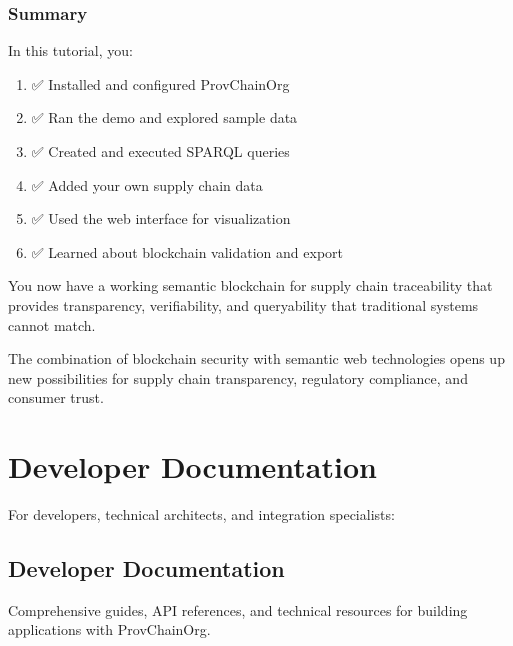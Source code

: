 \documentclass[letterpaper,10pt,english]{sphinxmanual}
\begin{document}
\subsubsection{Summary}
\label{\detokenize{user-guide/first-steps:summary}}
\sphinxAtStartPar
In this tutorial, you:
\begin{enumerate}
%
\item {} 
\sphinxAtStartPar
✅ Installed and configured ProvChainOrg

\item {} 
\sphinxAtStartPar
✅ Ran the demo and explored sample data

\item {} 
\sphinxAtStartPar
✅ Created and executed SPARQL queries

\item {} 
\sphinxAtStartPar
✅ Added your own supply chain data

\item {} 
\sphinxAtStartPar
✅ Used the web interface for visualization

\item {} 
\sphinxAtStartPar
✅ Learned about blockchain validation and export

\end{enumerate}

\sphinxAtStartPar
You now have a working semantic blockchain for supply chain traceability that provides transparency, verifiability, and queryability that traditional systems cannot match.

\sphinxAtStartPar
The combination of blockchain security with semantic web technologies opens up new possibilities for supply chain transparency, regulatory compliance, and consumer trust.




\section{Developer Documentation}
\label{\detokenize{index:developer-documentation}}
\sphinxAtStartPar
For developers, technical architects, and integration specialists:

\sphinxstepscope


\subsection{Developer Documentation}
\label{\detokenize{developer/index:developer-documentation}}\label{\detokenize{developer/index::doc}}
\sphinxAtStartPar
Comprehensive guides, API references, and technical resources for building applications with ProvChainOrg.
\end{document}
